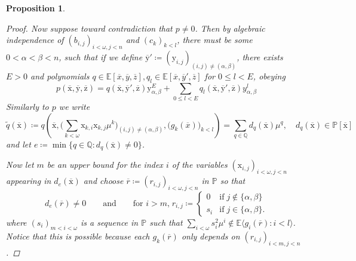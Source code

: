\documentclass{amsart}
\newtheorem{proposition}[theorem]{Proposition}
\theoremstyle{remark}
\theoremstyle{definition}
\theoremstyle{plain}
\newcommand{\bE}{\mathbb E}
\newcommand{\bP}{\mathbb P}
\newcommand{\bQ}{\mathbb Q}
\newcommand{\ox}{\overline{x}}
\newcommand{\oy}{\overline{y}}
\newcommand{\oz}{\overline{z}}
\newcommand{\var}[1]{\mathrm{#1}}
\theoremstyle{plain}
\begin{document}
\begin{proposition}
\begin{proof}
    Now suppose toward contradiction that $p \neq 0$. Then by algebraic independence of $(b_{i,j})_{i<\omega, j<n}$ and $(c_k)_{k<l}$, there must be some $0<\alpha<\beta <n$, such that if we define $\overline{\var{y}}'\coloneqq (\var{y}_{i,j})_{(i,j)\neq (\alpha, \beta)}$, there exists $E>0$ and polynomials $q\in \bE[ \ox,\oy,\oz],q_l\in \bE[ \ox,\oy',\oz]$ for $0 \leq l < E$, obeying
    \[p(\overline{\var{x}}, \overline{\var{y}}, \overline{\var{z}})=q(\overline{\var{x}}, \overline{\var{y}}', \overline{\var{z}})\var{y}_{\alpha, \beta}^E + \sum_{0\leq l<E}q_l(\overline{\var{x}}, \overline{\var{y}}', \overline{\var{z}})y_{\alpha,\beta}^{l}\]
    Similarly to $p$ we write
    \[\tilde{q}(\overline{\var{x}})\coloneqq 
    q\left(\overline{\var{x}},
        \big(\sum_{k<\omega} \var{x}_{k,i}\var{x}_{k,j} \mu^k\big)_{(i,j)\neq (\alpha, \beta)},
        \big(g_k(\overline{x})\big)_{k<l}\right)= \sum_{q \in \bQ} d_q(\overline{\var{x}}) \mu^{q}, \quad d_q(\overline{\var{x}}) \in \bP[\overline{\var{x}}]\]
    and let $e\coloneqq \min\{q \in \bQ: d_q (\overline{\var{x}}) \neq 0\}$.
    
    Now let $m$ be an upper bound for the index $i$ of the variables $(\var{x}_{i,j})_{i<\omega, j<n}$ appearing in $d_e(\overline{\var{x}})$ and choose $\overline{r}\coloneqq (r_{i,j})_{i<\omega, j<n}$ in $\bP$ so that
    \[d_e(\overline{r})\neq 0 \qquad \text{and} \qquad \text{for $i>m$,}\; r_{i,j}\coloneqq \begin{cases}
            0 &\text{if}\; j \notin \{\alpha, \beta\}\\
            s_{i} &\text{if}\; j \in \{\alpha, \beta\}.
        \end{cases}\]
    where $(s_i)_{m<i<\omega}$ is a sequence in $\bP$ such that $\sum_{i<\omega} s_i^2\mu^i \notin \bE \langle g_i(\overline{r}) : i <l\rangle$. 
    Notice that this is possible because each $g_k(\overline{r})$ only depends on $(r_{i,j})_{i<m, j<n}$.
    

\end{proof}
\end{proposition}
\end{document}
